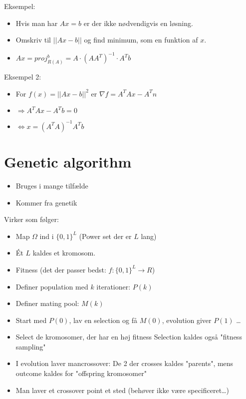 \documentclass[danish, 10pt]{Memoir}
\begin{document}
Eksempel:
\begin{itemize}
	\item Hvis man har $Ax=b$ er der ikke nødvendigvis en løsning.
	\item Omskriv til $||Ax-b||$ og find minimum, som en funktion af $x$.
	\item $Ax = proj_{R(A)}^b = A \cdot	(AA^T)^{-1} \cdot A^T b$
\end{itemize}

Eksempel 2:
\begin{itemize}
	\item For $f(x) = ||Ax-b||^2$ er $\nabla f = A^TAx - A^Tn $
	\item[] $\Rightarrow A^TAx-A^Tb = 0$
	\item[] $\Leftrightarrow x = (A^TA)^{-1}A^T b$
\end{itemize}


\newpage
\section*{Genetic algorithm}
\begin{itemize}
	\item Bruges i mange tilfælde
	\item Kommer fra genetik
\end{itemize}
Virker som følger:
\begin{itemize}
	\item Map $\Omega$ ind i $\{0, 1\}^L$ (Power set der er $L$ lang)
	\item Ét $L$ kaldes et kromosom.
	\item Fitness (det der passer bedst: $f: \{0,1\}^L \rightarrow R$)
	\item Definer population med $k$ iterationer: $P(k)$
	\item Definer mating pool: $M(k)$
	\item Start med $P(0)$, lav en selection og få $M(0)$, evolution giver $P(1)$ \dots
	\item Select de kromosomer, der har en høj fitness
	\subitem Selection kaldes også "fitness sampling"
	
	\item I evolution laver mancrossover:
	De 2 der crosses kaldes "parents", mens outcome kaldes for "offspring kromosomer"
	\item Man laver et crossover point et sted (behøver ikke være specificeret\dots)
\end{itemize}
\end{document}

